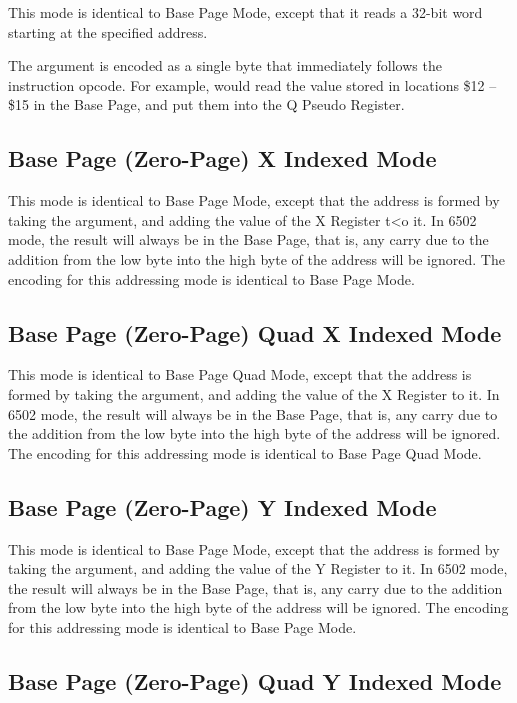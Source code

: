 This mode is identical to Base Page Mode, except that it reads a 32-bit word starting at the
specified address.

The argument is encoded as a single byte that immediately follows the instruction opcode. For
example,  would read the value stored in locations \$12 -- \$15 in the Base Page,
and put them into the Q Pseudo Register.  

\subsection{Base Page (Zero-Page) X Indexed Mode}

This mode is identical to Base Page Mode, except that the address is formed by taking the
argument, and adding the value of the X Register t<o it.  In 6502 mode, the result will always
be in the Base Page, that is, any carry due to the addition from the low byte into the high byte
of the address will be ignored.  The encoding for this addressing mode is identical to Base Page
Mode.

\subsection{Base Page (Zero-Page) Quad X Indexed Mode}

This mode is identical to Base Page Quad Mode, except that the address is formed by taking the
argument, and adding the value of the X Register to it.  In 6502 mode, the result will always
be in the Base Page, that is, any carry due to the addition from the low byte into the high byte
of the address will be ignored.  The encoding for this addressing mode is identical to Base Page Quad
Mode.

\subsection{Base Page (Zero-Page) Y Indexed Mode}

This mode is identical to Base Page Mode, except that the address is formed by taking the
argument, and adding the value of the Y Register to it.  In 6502 mode, the result will always
be in the Base Page, that is, any carry due to the addition from the low byte into the high byte
of the address will be ignored.  The encoding for this addressing mode is identical to Base Page
Mode.

\subsection{Base Page (Zero-Page) Quad Y Indexed Mode}

